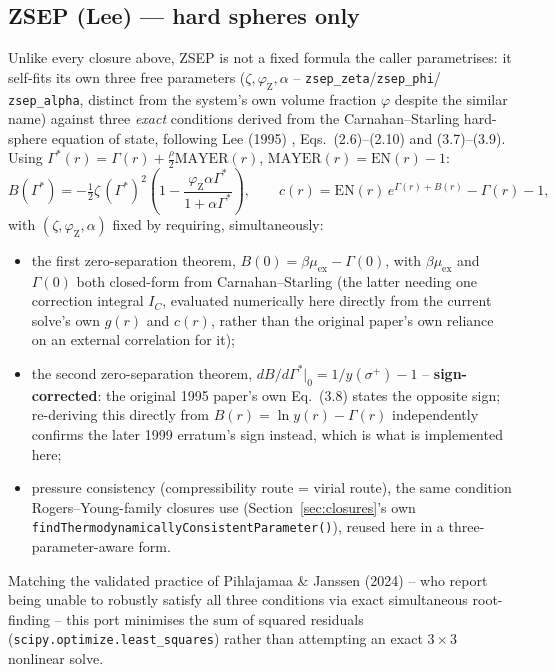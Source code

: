 \documentclass[11pt,a4paper]{article}
\newcommand{\code}[1]{\texttt{#1}}
\begin{document}
\subsection{ZSEP (Lee) \cite{lee1995,lee1999} --- hard spheres only}
\label{sec:zsep}
Unlike every closure above, ZSEP is not a fixed formula the caller
parametrises: it self-fits its own three free parameters
($\zeta,\varphi_{\mathrm{Z}},\alpha$ -- \code{zsep\_zeta}/\code{zsep\_phi}/
\code{zsep\_alpha}, distinct from the system's own volume fraction $\varphi$
despite the similar name) against three \emph{exact} conditions derived from
the Carnahan--Starling hard-sphere equation of state, following Lee (1995)
\cite{lee1995}, Eqs.~(2.6)--(2.10) and (3.7)--(3.9). Using
$\Gamma^*(r)=\Gamma(r)+\tfrac{\rho}{2}\mathrm{MAYER}(r)$,
$\mathrm{MAYER}(r)=\mathrm{EN}(r)-1$:
\begin{equation}
  B(\Gamma^*) = -\tfrac12\zeta\,(\Gamma^*)^2\left(1-\frac{\varphi_{\mathrm{Z}}\alpha\Gamma^*}{1+\alpha\Gamma^*}\right),
  \qquad
  c(r) = \mathrm{EN}(r)\,e^{\Gamma(r)+B(r)} - \Gamma(r) - 1,
\end{equation}
with $(\zeta,\varphi_{\mathrm{Z}},\alpha)$ fixed by requiring, simultaneously:
\begin{itemize}[nosep]
  \item[(A)] the first zero-separation theorem, $B(0)=\beta\mu_{\mathrm{ex}}-\Gamma(0)$,
    with $\beta\mu_{\mathrm{ex}}$ and $\Gamma(0)$ both closed-form from
    Carnahan--Starling (the latter needing one correction integral $I_C$,
    evaluated numerically here directly from the current solve's own $g(r)$
    and $c(r)$, rather than the original paper's own reliance on an external
    correlation for it);
  \item[(B)] the second zero-separation theorem,
    $dB/d\Gamma^*|_0 = 1/y(\sigma^+)-1$ -- \textbf{sign-corrected}: the
    original 1995 paper's own Eq.~(3.8) states the opposite sign; re-deriving
    this directly from $B(r)=\ln y(r)-\Gamma(r)$ independently confirms the
    later 1999 erratum's \cite{lee1999} sign instead, which is what is
    implemented here;
  \item[(C)] pressure consistency (compressibility route = virial route),
    the same condition Rogers--Young-family closures use
    (Section~\ref{sec:closures}'s own \code{findThermodynamicallyConsistentParameter()}),
    reused here in a three-parameter-aware form.
\end{itemize}
Matching the validated practice of Pihlajamaa \& Janssen (2024)
\cite{pihlajamaa2024} -- who report being unable to robustly satisfy all
three conditions via exact simultaneous root-finding -- this port minimises
the sum of squared residuals (\code{scipy.optimize.least\_squares}) rather
than attempting an exact $3\times3$ nonlinear solve.
\end{document}
